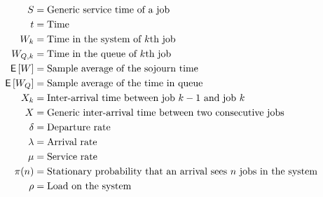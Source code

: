 \begin{align*}
 S &= \text{Generic service time of a job} \\
 t &= \text{Time} \\
 W_k &= \text{Time in the system of $k$th job} \\
 W_{Q,k} &= \text{Time in the queue of $k$th job} \\
 \,\mathsf{E}\left[W\right] &= \text{Sample average of the sojourn time} \\
 \,\mathsf{E}\left[W_Q\right] &= \text{Sample average of the time in queue} \\
 X_k &= \text{Inter-arrival time between job $k-1$ and job $k$} \\
 X &= \text{Generic inter-arrival time between two consecutive jobs} \\
 \delta &= \text{Departure rate} \\
 \lambda &= \text{Arrival rate} \\
 \mu &= \text{Service rate} \\
 \pi(n) &= \text{Stationary probability that an arrival sees $n$ jobs in the system} \\
 \rho &= \text{Load on the system} \\
\end{align*}
